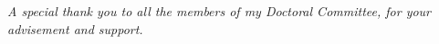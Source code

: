 \documentclass[../main.tex]{subfiles}
\begin{document}
    \newpage%
    \begin{spacing}{1.5}%
        \begin{center}%
            \textit{A special thank you to all the members of my Doctoral Committee, for your advisement and support.}\\%
        \end{center}%
    \end{spacing}%
\end{document}
